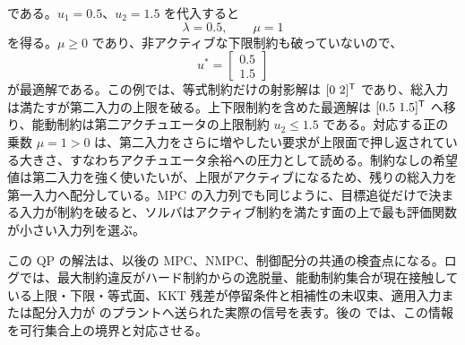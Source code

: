 である。$u_1=0.5$、$u_2=1.5$ を代入すると
\begin{equation}
  \lambda=0.5,
  \qquad
  \mu=1
\end{equation}
を得る。$\mu\ge0$ であり、非アクティブな下限制約も破っていないので、
\begin{equation}
  u^*=
  \begin{bmatrix}
    0.5\\1.5
  \end{bmatrix}
\end{equation}
が最適解である。この例では、等式制約だけの射影解は $[0\ 2]^{\mathsf{T}}$ であり、総入力は満たすが第二入力の上限を破る。上下限制約を含めた最適解は $[0.5\ 1.5]^{\mathsf{T}}$ へ移り、能動制約は第二アクチュエータの上限制約 $u_2\le1.5$ である。対応する正の乗数 $\mu=1>0$ は、第二入力をさらに増やしたい要求が上限面で押し返されている大きさ、すなわちアクチュエータ余裕への圧力として読める。制約なしの希望値は第二入力を強く使いたいが、上限がアクティブになるため、残りの総入力を第一入力へ配分している。MPC の入力列でも同じように、目標追従だけで決まる入力が制約を破ると、ソルバはアクティブ制約を満たす面の上で最も評価関数が小さい入力列を選ぶ。

この QP の解法は、以後の MPC、NMPC、制御配分の共通の検査点になる。ログでは、最大制約違反がハード制約からの逸脱量、能動制約集合が現在接触している上限・下限・等式面、KKT 残差が停留条件と相補性の未収束、適用入力または配分入力が  のプラントへ送られた実際の信号を表す。後の  では、この情報を可行集合上の境界と対応させる。

